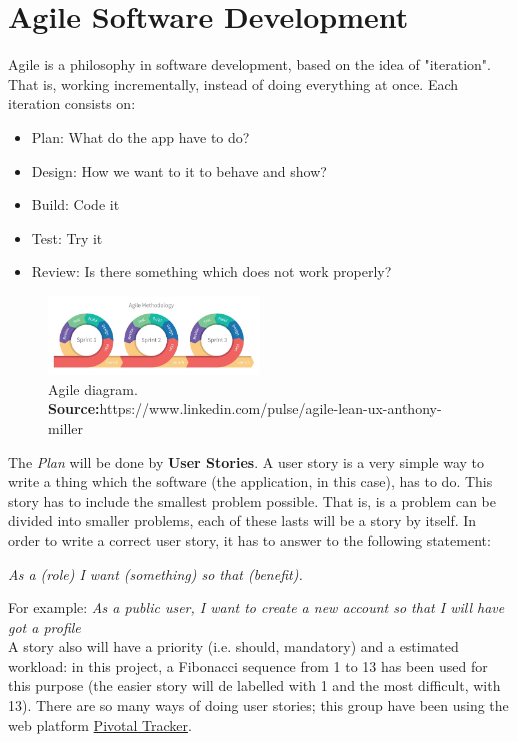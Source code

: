     
\section{Agile Software Development} \label{Agile}

Agile is a philosophy in software development, based on the idea of "iteration". That is, working incrementally, instead of doing everything at once. Each iteration consists on:
\begin{itemize}
\setlength{\itemsep}{-5pt}
\item Plan: What do the app have to do?
\item Design: How we want to it to behave and show?
\item Build: Code it
\item Test: Try it
\item Review: Is there something which does not work properly?
\end{itemize}

\begin{figure}[H]
	\centering
    \includegraphics[trim={0 0 0 0},clip,width=0.5\textwidth]{Files/agile.jpg}
    \caption{Agile diagram.\\ \textbf{Source:}https://www.linkedin.com/pulse/agile-lean-ux-anthony-miller}
    \label{fig: Agile}
\end{figure}
The \textit{Plan} will be done by \textbf{User Stories}. A user story is a very simple way to write a thing which the software (the application, in this case), has to do. This story has to include the smallest problem possible. That is, is a problem can be divided into smaller problems, each of these lasts will be a story by itself. In order to write a correct user story, it has to answer to the following statement:
\begin{center}
\textit{As a (role) I want (something) so that (benefit).}
\end{center}
For example: \textit{As a public user, I want to create a new account so that I will have got a profile}\\
A story also will have a priority (i.e. should, mandatory) and a estimated workload: in this project, a Fibonacci sequence from 1 to 13 has been used for this purpose (the easier story will de labelled with 1 and the most difficult, with 13). There are so many ways of doing user stories; this group have been using the web platform \href{https://www.pivotaltracker.com/}{Pivotal Tracker}.
\cite{agile:modeling} 
\cite{agile:nutshell}
